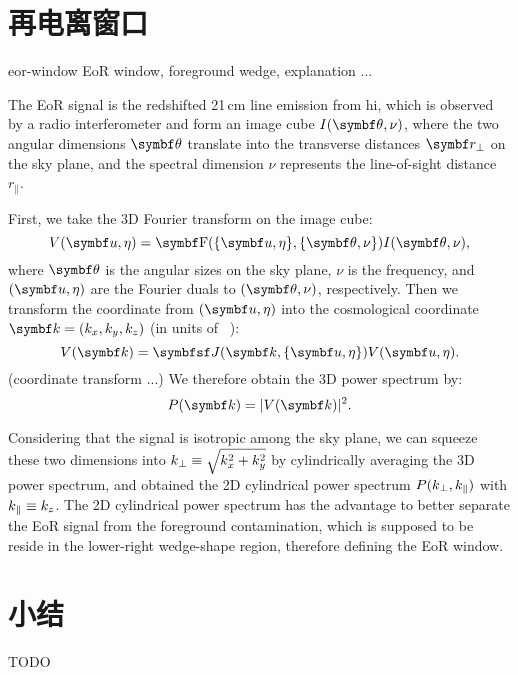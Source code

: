 \section{再电离窗口}
\label{sec:eor-window}

\acl{eor-window}
EoR window, foreground wedge, explanation ...

The EoR signal is the redshifted 21\,cm line emission from \acs{hi},
which is observed by a radio interferometer and form an image cube
$I(\B{\theta}, \nu)$, where the two angular dimensions $\B{\theta}$
translate into the transverse distances $\B{r}_{\bot}$ on the sky plane,
and the spectral dimension $\nu$ represents the line-of-sight distance
$r_{\parallel}$.

First, we take the 3D Fourier transform on the image cube:
\begin{equation}
  \label{eq:ps-3d-ft}
  V(\B{u}, \eta) = \B{\R{F}}(\{\B{u}, \eta\}, \{\B{\theta}, \nu\})
    I(\B{\theta}, \nu),
\end{equation}
where $\B{\theta}$ is the angular sizes on the sky plane, $\nu$ is the
frequency, and $(\B{u}, \eta)$ are the Fourier duals to
$(\B{\theta}, \nu)$, respectively.
Then we transform the coordinate from $(\B{u}, \eta)$ into the
cosmological coordinate $\B{k} = (k_x, k_y, k_z)$
(in units of \si{\per\cMpc}):
\begin{equation}
  \label{eq:coordinate-transform}
  V(\B{k}) = \M{J}(\B{k}, \{\B{u}, \eta\}) V(\B{u}, \eta).
\end{equation}
(coordinate transform ...)
We therefore obtain the 3D power spectrum by:
\begin{equation}
  \label{eq:3d-ps}
  P(\B{k}) = |V(\B{k})|^2.
\end{equation}

Considering that the signal is isotropic among the sky plane, we can
squeeze these two dimensions into $\text{$k_{\bot}$} \equiv \sqrt{k_x^2 + k_y^2}$ by
cylindrically averaging the 3D power spectrum, and obtained the 2D
cylindrical power spectrum $P(\text{$k_{\bot}$}, \text{$k_{\parallel}$})$ with $\text{$k_{\parallel}$} \equiv k_z$.
The 2D cylindrical power spectrum has the advantage to better separate
the EoR signal from the foreground contamination, which is supposed to
be reside in the lower-right wedge-shape region, therefore defining the
EoR window.


\section{小结}

TODO


